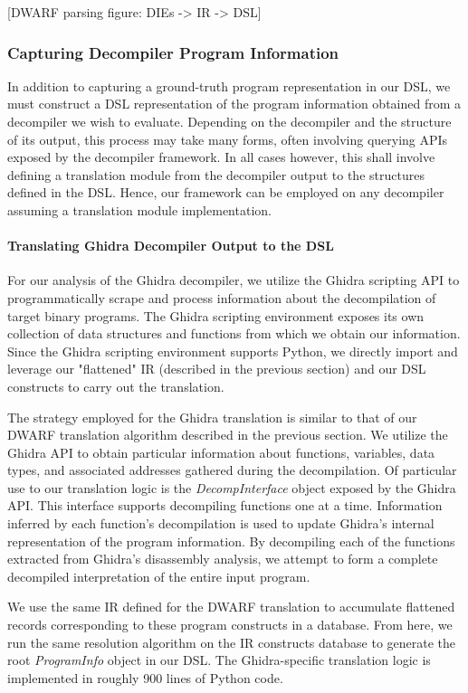 \documentclass[conference]{IEEEtran}
\begin{document}
[DWARF parsing figure: DIEs -> IR -> DSL]

\subsubsection{Capturing Decompiler Program Information}

In addition to capturing a ground-truth program representation in our DSL, we must construct a DSL representation of the program information obtained from a decompiler we wish to evaluate. Depending on the decompiler and the structure of its output, this process may take many forms, often involving querying APIs exposed by the decompiler framework. In all cases however, this shall involve defining a translation module from the decompiler output to the structures defined in the DSL. Hence, our framework can be employed on any decompiler assuming a translation module implementation.

\paragraph{Translating Ghidra Decompiler Output to the DSL}

For our analysis of the Ghidra decompiler, we utilize the Ghidra scripting API to programmatically scrape and process information about the decompilation of target binary programs. The Ghidra scripting environment exposes its own collection of data structures and functions from which we obtain our information. Since the Ghidra scripting environment supports Python, we directly import and leverage our "flattened" IR (described in the previous section) and our DSL constructs to carry out the translation.

The strategy employed for the Ghidra translation is similar to that of our DWARF translation algorithm described in the previous section. We utilize the Ghidra API to obtain particular information about functions, variables, data types, and associated addresses gathered during the decompilation. Of particular use to our translation logic is the \emph{DecompInterface} object exposed by the Ghidra API. This interface supports decompiling functions one at a time. Information inferred by each function's decompilation is used to update Ghidra's internal representation of the program information. By decompiling each of the functions extracted from Ghidra's disassembly analysis, we attempt to form a complete decompiled interpretation of the entire input program.

We use the same IR defined for the DWARF translation to accumulate flattened records corresponding to these program constructs in a database. From here, we run the same resolution algorithm on the IR constructs database to generate the root \emph{ProgramInfo} object in our DSL. The Ghidra-specific translation logic is implemented in roughly 900 lines of Python code.
\end{document}
